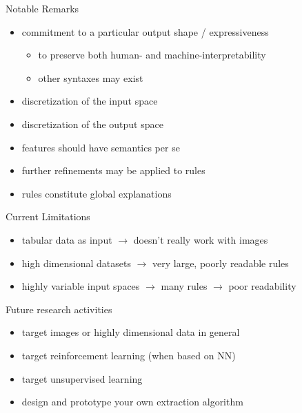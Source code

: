 \documentclass[presentation]{beamer}\mode<presentation>{\usetheme{AMSBolognaFC}}
\begin{document}
\begin{frame}{Notable Remarks}
    \begin{itemize}
        \item commitment to a particular output shape / expressiveness
        \begin{itemize}
            \item to preserve both human- and machine-interpretability
            \item other syntaxes may exist
        \end{itemize}
        \item discretization of the input space
        \item discretization of the output space
        \item features should have semantics per se
        \item further refinements may be applied to rules
        \item rules constitute global explanations
    \end{itemize}
\end{frame}

\begin{frame}{Current Limitations}
    \begin{itemize}
        \item tabular data as input $\rightarrow$ doesn't really work with images
        \item high dimensional datasets $\rightarrow$ very large, poorly readable rules
        \item highly variable input spaces $\rightarrow$ many rules $\rightarrow$ poor readability
    \end{itemize}
\end{frame}

\begin{frame}{Future research activities}
    \begin{itemize}
        \item target images or highly dimensional data in general
        \item target reinforcement learning (when based on NN)
        \item target unsupervised learning
        \item design and prototype your own extraction algorithm
    \end{itemize}
\end{frame}

\end{document}
